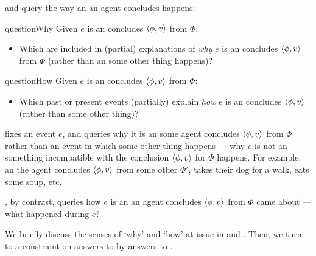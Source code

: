 \begin{note}
  \qWhy{} and \qHow{} query the way an  an agent concludes happens:

  \begin{question}{questionWhy}{\qWhy{}}
    Given \(e\) is an  \vAgent{} concludes \(\langle\phi, v\rangle\) from \(\Phi\):
    \begin{itemize}
    \item
      Which  are included in (partial) explanations of \emph{why} \(e\) is an  \vAgent{} concludes \(\langle\phi, v\rangle\) from \(\Phi\) (rather than an  some other thing happens)?
    \end{itemize}
    \vspace{-1\baselineskip}
  \end{question}

  \begin{question}{questionHow}{\qHow{}}
    \label{q:how}
    Given \(e\) is an  \vAgent{} concludes \(\langle\phi, v\rangle\) from \(\Phi\):
    \begin{itemize}
    \item
      Which past or present events (partially) explain \emph{how} \(e\) is an  \vAgent{} concludes \(\langle\phi, v\rangle\) (rather than some other thing)?
    \end{itemize}
    \vspace{-1.5\baselineskip}
  \end{question}
\end{note}


\begin{note}
  \qWhy{} fixes an event \(e\), and queries why it is an  some agent concludes \(\langle\phi, v\rangle\) from \(\Phi\) rather than an event in which some other thing happens --- why \(e\) is not an  something incompatible with the conclusion \(\langle\phi, v\rangle\) for \(\Phi\) happens.
  For example, an  the agent concludes \(\langle\phi, v\rangle\) from some other \pool{} \(\Phi'\), takes their dog for a walk, eats some soup, etc.

  \qHow{}, by contrast, queries how \(e\) is an  an agent concludes \(\langle\phi, v\rangle\) from \(\Phi\) came about --- what happened during \(e\)?
\end{note}

\begin{note}
  We briefly discuss the senses of `why' and `how' at issue in \qWhy{} and \qHow{}.
  Then, we turn to a constraint on answers to \qWhy{} by answers to \qHow{}.
\end{note}


